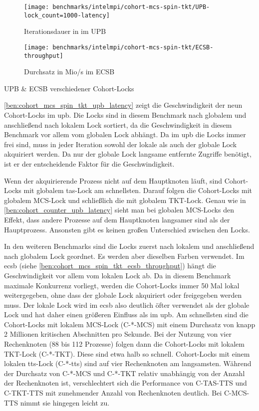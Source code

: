 \begin{benchmark}[h]
    \begin{subfigure}{.5\textwidth}
        \texttt{[image: benchmarks/intelmpi/cohort-mcs-spin-tkt/UPB-lock\_count=1000-latency]}
        \caption{Iterationsdauer in  im UPB}
        \label{ben:cohort_mcs_spin_tkt_upb_latency}
    \end{subfigure}
    \begin{subfigure}{.5\textwidth}
        \texttt{[image: benchmarks/intelmpi/cohort-mcs-spin-tkt/ECSB-throughput]}
        \caption{Durchsatz in Mio/s im ECSB}
        \label{ben:cohort_mcs_spin_tkt_ecsb_throughput}
    \end{subfigure}
    \caption{UPB \& ECSB verschiedener Cohort-Locks}
    \label{ben:cohort_mcs_spin_tkt_upb_ecsb}
\end{benchmark}

\autoref{ben:cohort_mcs_spin_tkt_upb_latency} zeigt die Geschwindigkeit der neun Cohort-Locks im \gls{upb}.
Die Locks sind in diesem Benchmark nach globalem und anschließend nach lokalem Lock sortiert,
da die Geschwindigkeit in diesem Benchmark vor allem vom globalen Lock abhängt.
Da im \gls{upb} die Locks immer frei sind,
muss in jeder Iteration sowohl der lokale
als auch der globale Lock akquiriert werden.
Da nur der globale Lock langsame entfernte Zugriffe benötigt,
ist er der entscheidende Faktor für die Geschwindigkeit.

Wenn der akquirierende Prozess nicht auf dem Hauptknoten läuft,
sind Cohort-Locks mit globalem \gls{tas}-Lock am schnellsten.
Darauf folgen die Cohort-Locks mit globalem MCS-Lock
und schließlich die mit globalem TKT-Lock.
Genau wie in \autoref{ben:cohort_counter_upb_latency} sieht man bei globalen MCS-Locks
den Effekt,
dass andere Prozesse auf dem Hauptknoten langsamer sind als der Hauptprozess.
Ansonsten gibt es keinen großen Unterschied zwischen den Locks.

In den weiteren Benchmarks sind die Locks zuerst nach lokalem
und anschließend nach globalem Lock geordnet.
Es werden aber dieselben Farben verwendet.
Im \gls{ecsb} (siehe \autoref{ben:cohort_mcs_spin_tkt_ecsb_throughput})
hängt die Geschwindigkeit vor allem vom lokalen Lock ab.
Da in diesem Benchmark maximale Konkurrenz vorliegt,
werden die Cohort-Locks immer 50 Mal lokal weitergegeben,
ohne dass der globale Lock akquiriert oder freigegeben werden muss.
Der lokale Lock wird im \gls{ecsb} also deutlich öfter verwendet
als der globale Lock
und hat daher einen größeren Einfluss
als im \gls{upb}.
Am schnellsten sind die Cohort-Locks mit lokalem MCS-Lock (C-*-MCS)
mit einem Durchsatz von knapp 2 Millionen kritischen Abschnitten pro Sekunde.
Bei der Nutzung von vier Rechenknoten (88 bis 112 Prozesse)
folgen dann die Cohort-Locks mit lokalem TKT-Lock (C-*-TKT).
Diese sind etwa halb so schnell.
Cohort-Locks mit einem lokalen \gls{tts}-Lock (C-*-\gls{tts})
sind auf vier Rechenknoten am langsamsten.
Während der Durchsatz von C-*-MCS und C-*-TKT
relativ unabhängig von der Anzahl der Rechenknoten ist,
verschlechtert sich die Performance von C-TAS-TTS und C-TKT-TTS
mit zunehmender Anzahl von Rechenknoten deutlich.
Bei C-MCS-TTS nimmt sie hingegen leicht zu.

